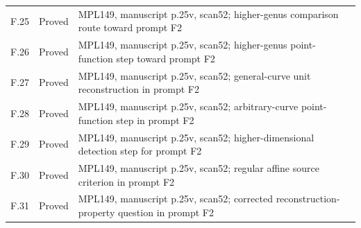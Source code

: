 {\begin{longtable}{p{1.9cm}p{1.7cm}p{10.3cm}}
F.25 & Proved & MPL149, manuscript p.25v, scan52; higher-genus comparison route toward prompt F2 \\
F.26 & Proved & MPL149, manuscript p.25v, scan52; higher-genus point-function step toward prompt F2 \\
F.27 & Proved & MPL149, manuscript p.25v, scan52; general-curve unit reconstruction in prompt F2 \\
F.28 & Proved & MPL149, manuscript p.25v, scan52; arbitrary-curve point-function step in prompt F2 \\
F.29 & Proved & MPL149, manuscript p.25v, scan52; higher-dimensional detection step for prompt F2 \\
F.30 & Proved & MPL149, manuscript p.25v, scan52; regular affine source criterion in prompt F2 \\
F.31 & Proved & MPL149, manuscript p.25v, scan52; corrected reconstruction-property question in prompt F2 \\
\bottomrule\end{longtable}
}
